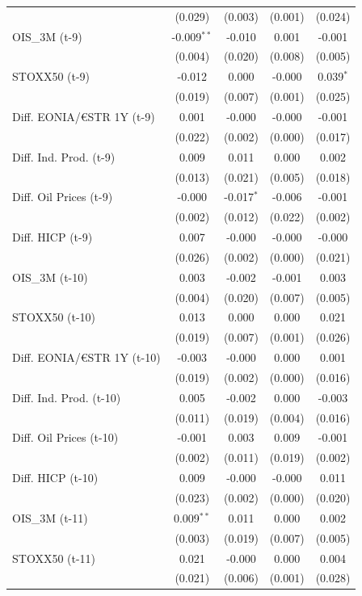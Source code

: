 \begin{longtable}[t]{lcccc}
 & (0.029) & (0.003) & (0.001) & (0.024)\\
OIS\_3M (t-9) & -0.009$^{**}$ & -0.010 & 0.001 & -0.001\\
 & (0.004) & (0.020) & (0.008) & (0.005)\\
STOXX50 (t-9) & -0.012 & 0.000 & -0.000 & 0.039$^{*}$\\
 & (0.019) & (0.007) & (0.001) & (0.025)\\
Diff. EONIA/€STR 1Y (t-9) & 0.001 & -0.000 & -0.000 & -0.001\\
 & (0.022) & (0.002) & (0.000) & (0.017)\\
Diff. Ind. Prod. (t-9) & 0.009 & 0.011 & 0.000 & 0.002\\
 & (0.013) & (0.021) & (0.005) & (0.018)\\
Diff. Oil Prices (t-9) & -0.000 & -0.017$^{*}$ & -0.006 & -0.001\\
 & (0.002) & (0.012) & (0.022) & (0.002)\\
Diff. HICP (t-9) & 0.007 & -0.000 & -0.000 & -0.000\\
 & (0.026) & (0.002) & (0.000) & (0.021)\\
OIS\_3M (t-10) & 0.003 & -0.002 & -0.001 & 0.003\\
 & (0.004) & (0.020) & (0.007) & (0.005)\\
STOXX50 (t-10) & 0.013 & 0.000 & 0.000 & 0.021\\
 & (0.019) & (0.007) & (0.001) & (0.026)\\
Diff. EONIA/€STR 1Y (t-10) & -0.003 & -0.000 & 0.000 & 0.001\\
 & (0.019) & (0.002) & (0.000) & (0.016)\\
Diff. Ind. Prod. (t-10) & 0.005 & -0.002 & 0.000 & -0.003\\
 & (0.011) & (0.019) & (0.004) & (0.016)\\
Diff. Oil Prices (t-10) & -0.001 & 0.003 & 0.009 & -0.001\\
 & (0.002) & (0.011) & (0.019) & (0.002)\\
Diff. HICP (t-10) & 0.009 & -0.000 & -0.000 & 0.011\\
 & (0.023) & (0.002) & (0.000) & (0.020)\\
OIS\_3M (t-11) & 0.009$^{**}$ & 0.011 & 0.000 & 0.002\\
 & (0.003) & (0.019) & (0.007) & (0.005)\\
STOXX50 (t-11) & 0.021 & -0.000 & 0.000 & 0.004\\
 & (0.021) & (0.006) & (0.001) & (0.028)\\

\end{longtable}
